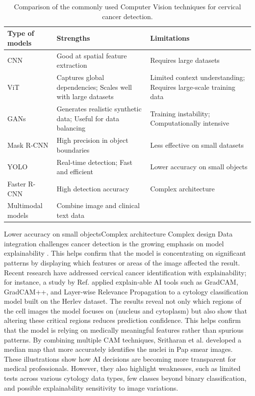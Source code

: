 \documentclass{svjour3}
\begin{document}
\begin{table}[htbp]
\centering
\caption{Comparison of the commonly used Computer Vision techniques for cervical cancer detection.}
\label{tab:comparison}
\begin{tabular}{|l|p{5cm}|p{5cm}|}
\hline
\textbf{Type of models} & \textbf{Strengths} & \textbf{Limitations} \\
\hline
CNN & Good at spatial feature extraction & Requires large datasets \\
\hline
ViT & Captures global dependencies; Scales well with large datasets & Limited context understanding; Requires large‑scale training data \\
\hline
GANs & Generates realistic synthetic data; Useful for data balancing & Training instability; Computationally intensive \\
\hline
Mask R-CNN & High precision in object boundaries & Less effective on small datasets \\
\hline
YOLO & Real‑time detection; Fast and efficient & Lower accuracy on small objects \\
\hline
Faster R-CNN & High detection accuracy & Complex architecture \\
\hline
Multimodal models & Combine image and clinical text data & \\
\hline
\end{tabular}
\end{table}

Lower accuracy on small objectsComplex architecture
Complex design Data integration challenges
cancer detection is the growing emphasis on model explainability \cite{ref153}. This helps confirm that the model is concentrating on significant patterns by displaying which features or areas of the image affected the result. Recent research have addressed cervical cancer identification with explainability; for instance, a study by Ref. \cite{ref154} applied explain‑able AI tools such as GradCAM, GradCAM++, and Layer‑wise Relevance Propagation to a cytology classification model built on the Herlev dataset. The results reveal not only which regions of the cell images the model focuses on (nucleus and cytoplasm) but also show that altering these critical regions reduces prediction confidence. This helps confirm that the model is relying on medically meaningful features rather than spurious patterns. By combining multiple CAM techniques, Sritharan et al. \cite{ref155} developed a median map that more accurately identifies the nuclei in Pap smear images. These illustrations show how AI decisions are becoming more transparent for medical professionals. However, they also highlight weaknesses, such as limited tests across various cytology data types, few classes beyond binary classification, and possible explainability sensitivity to image variations.
\end{document}
